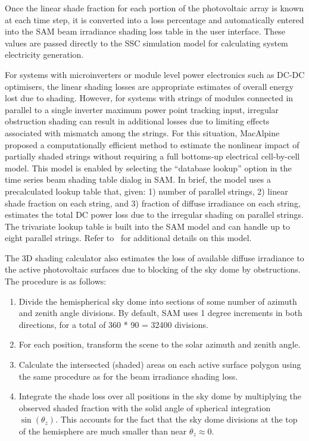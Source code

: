 \documentclass[12pt,letterpaper]{article}
\begin{document}
Once the linear shade fraction for each portion of the photovoltaic array is known at each time step, it is converted into a loss percentage and automatically entered into the SAM beam irradiance shading loss table in the user interface. These values are passed directly to the SSC simulation model for calculating system electricity generation.

For systems with microinverters or module level power electronics such as DC-DC optimisers, the linear shading losses are appropriate estimates of overall energy lost due to shading.  However, for systems with strings of modules connected in parallel to a single inverter maximum power point tracking input, irregular obstruction shading can result in additional losses due to limiting effects associated with mismatch among the strings.  For this situation, MacAlpine~\cite{macalpine2015} proposed a computationally efficient method to estimate the nonlinear impact of partially shaded strings without requiring a full bottoms-up electrical cell-by-cell model.  This model is enabled by selecting the ``database lookup'' option in the time series beam shading table dialog in SAM.  In brief, the model uses a precalculated lookup table that, given: 1) number of parallel strings, 2) linear shade fraction on each string, and 3) fraction of diffuse irradiance on each string, estimates the total DC power loss due to the irregular shading on parallel strings.  The trivariate lookup table is built into the SAM model and can handle up to eight parallel strings.  Refer to~\cite{macalpine2015} for additional details on this model.

The 3D shading calculator also estimates the loss of available diffuse irradiance to the active photovoltaic surfaces due to blocking of the sky dome by obstructions.  The procedure is as follows:
\begin{enumerate}
\item Divide the hemispherical sky dome into sections of some number of azimuth and zenith angle divisions.  By default, SAM uses 1 degree increments in both directions, for a total of 360 * 90 = 32400 divisions.
\item For each position, transform the scene to the solar azimuth and zenith angle.
\item Calculate the intersected (shaded) areas on each active surface polygon using the same procedure as for the beam irradiance shading loss.
\item Integrate the shade loss over all positions in the sky dome by multiplying the observed shaded fraction with the solid angle of spherical integration $\sin(\theta_z)$.  This accounts for the fact that the sky dome divisions at the top of the hemisphere are much smaller than near $\theta_z\approx 0$.
\end{enumerate}
\end{document}
